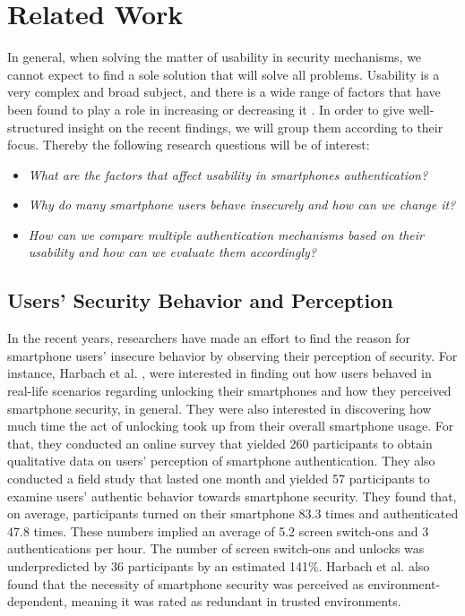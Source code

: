 \section{Related Work} \label{2.2}

In general, when solving the matter of usability in security mechanisms, we cannot expect to find a sole solution that will solve all problems. Usability is a very complex and broad subject, and there is a wide range of factors that have been found to play a role in increasing or decreasing it \cite{anonymous,harbach,Albayram:2017:BUL:3235924.3235929, AnatomySmartphone}. In order to give well-structured insight on the recent findings, we will group them according to their focus. Thereby the following research questions will be of interest: 

\begin{itemize}
    \item \textit{What are the factors that affect usability in smartphones authentication?}
\item \textit{Why do many smartphone users behave insecurely and how can we change it?} 
    \item \textit{How can we compare multiple authentication mechanisms based on their usability and how can we evaluate them accordingly?}
\end{itemize}

\subsection{Users' Security Behavior and Perception} \label{2.2.1}

In the recent years, researchers have made an effort to find the reason for smartphone users' insecure behavior by observing their perception of security. For instance, Harbach et al. \cite{harbach}, were interested in finding out how users behaved in real-life scenarios regarding unlocking their smartphones and how they perceived smartphone security, in general. They were also interested in discovering how much time the act of unlocking took up from their overall smartphone usage. For that, they conducted an online survey that yielded 260 participants to obtain qualitative data on users' perception of smartphone authentication. They also conducted a field study that lasted one month and yielded 57 participants to examine users' authentic behavior towards smartphone security. They found that, on average, participants turned on their smartphone 83.3 times and authenticated 47.8 times. These numbers implied an average of 5.2 screen switch-ons and 3 authentications per hour. The number of screen switch-ons and unlocks was underpredicted by 36 participants by an estimated 141\%. Harbach et al. \cite{harbach} also found that the necessity of smartphone security was perceived as environment-dependent, meaning it was rated as redundant in trusted environments.\\

